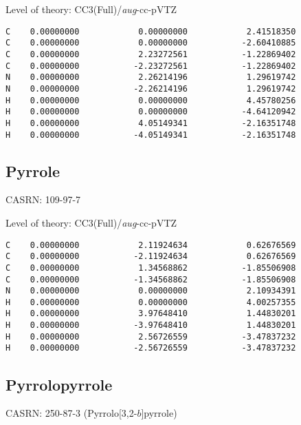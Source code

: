 \documentclass[journal=jctcce,manuscript=article,layout=traditional]{achemso}
\newcommand{\AVTZ}{\emph{aug}-cc-pVTZ}
\begin{document}
\begin{singlespace}
\noindent Level of theory: CC3(Full)/{\AVTZ}
\begin{verbatim}
C    0.00000000            0.00000000            2.41518350
C    0.00000000            0.00000000           -2.60410885
C    0.00000000            2.23272561           -1.22869402
C    0.00000000           -2.23272561           -1.22869402
N    0.00000000            2.26214196            1.29619742
N    0.00000000           -2.26214196            1.29619742
H    0.00000000            0.00000000            4.45780256
H    0.00000000            0.00000000           -4.64120942
H    0.00000000            4.05149341           -2.16351748
H    0.00000000           -4.05149341           -2.16351748
\end{verbatim}
\end{singlespace}

\subsection{Pyrrole}

CASRN: 109-97-7

\begin{singlespace}
\noindent Level of theory: CC3(Full)/{\AVTZ}
\begin{verbatim}
C    0.00000000            2.11924634            0.62676569
C    0.00000000           -2.11924634            0.62676569
C    0.00000000            1.34568862           -1.85506908
C    0.00000000           -1.34568862           -1.85506908
N    0.00000000            0.00000000            2.10934391
H    0.00000000            0.00000000            4.00257355
H    0.00000000            3.97648410            1.44830201
H    0.00000000           -3.97648410            1.44830201
H    0.00000000            2.56726559           -3.47837232
H    0.00000000           -2.56726559           -3.47837232
\end{verbatim}
\end{singlespace}

\subsection{Pyrrolopyrrole}

CASRN: 250-87-3  (Pyrrolo[3,2-$b$]pyrrole)
\end{document}
